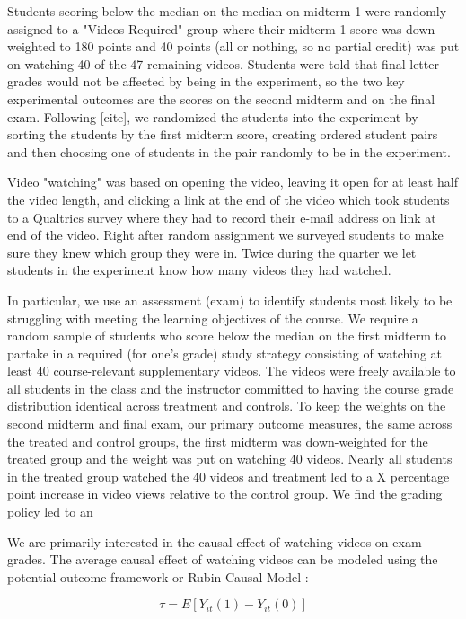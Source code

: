 \documentclass[12pt]{article}
\begin{document}
Students scoring below the median on the median on midterm 1 were randomly assigned to a "Videos Required" group where their midterm 1 score was down-weighted to 180 points and 40 points (all or nothing, so no partial credit) was put on watching 40 of the 47 remaining videos. Students were told that final letter grades would not be affected by being in the experiment, so the two key experimental outcomes are the scores on the second midterm and on the final exam. Following [cite], we randomized the students into the experiment by sorting the students by the first midterm score, creating ordered student pairs and then choosing one of students in the pair randomly to be in the experiment.

Video "watching" was based on opening the video, leaving it open for at least half the video length, and clicking a link at the end of the video which took students to a Qualtrics survey where they had to record their e-mail address on link at end of the video. Right after random assignment we surveyed students to make sure they knew which group they were in. Twice during the quarter we let students in the experiment know how many videos they had watched.

In particular, we use an assessment (exam) to identify students most likely to be struggling with meeting the learning objectives of the course. We require a random sample of students who score below the median on the first midterm to partake in a required (for one's grade) study strategy consisting of watching at least 40 course-relevant supplementary videos. The videos were freely available to all students in the class and the instructor committed to having the course grade distribution identical across treatment and controls. To keep the weights on the second midterm and final exam, our primary outcome measures, the same across the treated and control groups, the first midterm was down-weighted for the treated group and the weight was put on watching 40 videos. Nearly all students in the treated group watched the 40 videos and treatment led to a X percentage point increase in video views relative to the control group. We find the grading policy led to an



We are primarily interested in the causal effect of watching videos on exam grades. The average causal effect of watching videos can be modeled using the potential outcome framework or Rubin Causal Model \parencite{ir2015}:

\begin{equation}
	\tau = E[Y_{it}(1) - Y_{it}(0)]
\end{equation}
\end{document}
